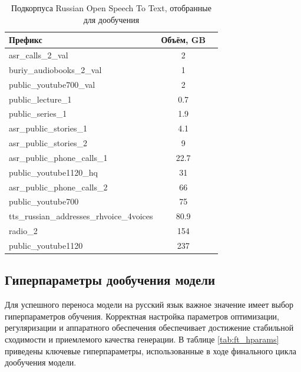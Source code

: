 \begin{table}[h!]
  \centering
  \begin{tabular}{|l|c|c|}
    \hline
    \textbf{Префикс} & \textbf{Объём, GB} \\ 
    \hline
    asr\_calls\_2\_val                       & 2     \\
    buriy\_audiobooks\_2\_val                & 1     \\
    public\_youtube700\_val                  & 2     \\ 
    public\_lecture\_1                       & 0.7   \\
    public\_series\_1                        & 1.9   \\
    asr\_public\_stories\_1                  & 4.1   \\
    asr\_public\_stories\_2                  & 9     \\
    asr\_public\_phone\_calls\_1             & 22.7  \\
    public\_youtube1120\_hq                  & 31    \\
    asr\_public\_phone\_calls\_2             & 66    \\
    public\_youtube700                       & 75    \\
    tts\_russian\_addresses\_rhvoice\_4voices& 80.9  \\
    radio\_2                                 & 154   \\
    public\_youtube1120                      & 237   \\
    \hline
  \end{tabular}
  \caption{Подкорпуса Russian Open Speech To Text, отобранные для дообучения}
  \label{tab:ru_splits}
\end{table}


\subsection{Гиперпараметры дообучения модели}

Для успешного переноса модели на русский язык важное значение имеет выбор гиперпараметров обучения.  
Корректная настройка параметров оптимизации, регуляризации и аппаратного обеспечения обеспечивает  
достижение стабильной сходимости и приемлемого качества генерации. В таблице \ref{tab:ft_hparams}  
приведены ключевые гиперпараметры, использованные в ходе финального цикла дообучения модели.

